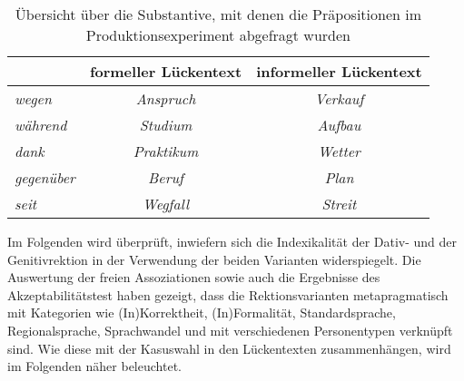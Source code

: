 \begin{table}
\centering
\begin{tabular}{lcc}
\textit{\textbf{}} & formeller Lückentext & informeller Lückentext \\ \hline
\textit{wegen}     & \textit{Anspruch}             & \textit{Verkauf}                \\ %
\textit{während}   & \textit{Studium}              & \textit{Aufbau}                 \\ %
\textit{dank}      & \textit{Praktikum}            & \textit{Wetter}                 \\ %
\textit{gegenüber} & \textit{Beruf}                & \textit{Plan}                   \\ %
\textit{seit}      & \textit{Wegfall}              & \textit{Streit}                 \\ 
\end{tabular}
\caption{Übersicht über die Substantive, mit denen die Präpositionen im Produktionsexperiment abgefragt wurden}
\label{table:ProdBsp}
\end{table}

Im Folgenden wird überprüft, inwiefern sich die Indexikalität der Dativ- und der Genitivrektion in der Verwendung der beiden Varianten widerspiegelt. 
Die Auswertung der freien Assoziationen sowie auch die Ergebnisse des Akzeptabilitätstest haben gezeigt, dass die Rektionsvarianten metapragmatisch mit Kategorien wie (In)Korrektheit, (In)Formalität, Standardsprache, Regionalsprache, Sprachwandel und mit verschiedenen Personentypen verknüpft sind. 
Wie diese mit der Kasuswahl in den Lückentexten zusammenhängen, wird im Folgenden näher beleuchtet. 

